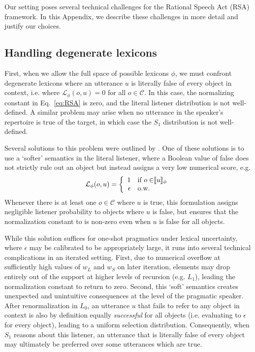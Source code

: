 \documentclass[11pt, floatsintext]{apa6}
\newcommand{\den}[1]{\ensuremath{\llbracket #1 \rrbracket}}
\begin{document}
Our setting poses several technical challenges for the Rational Speech Act (RSA) framework.
In this Appendix, we describe these challenges in more detail and justify our choices.

\subsection{Handling degenerate lexicons}

First, when we allow the full space of possible lexicons $\phi$, we must confront degenerate lexicons where an utterance $u$ is literally false of every object in context, i.e. where $\mathcal{L}_\phi(o, u) = 0$ for all $o\in \mathcal{C}$. 
In this case, the normalizing constant in Eq.~\ref{eq:RSA} is zero, and the literal listener distribution is not well-defined.
A similar problem may arise when no utterance in the speaker's repertoire is true of the target, in which case the $S_1$ distribution is not well-defined.

Several solutions to this problem were outlined by .
One of these solutions is to use a `softer' semantics in the literal listener, where a Boolean value of false does not strictly rule out an object but instead assigns a very low numerical score, e.g. 
$$\mathcal{L}_\phi(o,u) = \left\{ \begin{array} {rl} 1 & \textrm{if $o \in $\den{u}$_\phi$} \\ \epsilon & \textrm{o.w.} \end{array}\right.$$
Whenever there is at least one $o\in\mathcal{C}$ where $u$ is true, this formulation assigns negligible listener probability to objects where $u$ is false, but ensures that the normalization constant to is non-zero even when $u$ is false for all objects.

While this solution suffices for one-shot pragmatics under lexical uncertainty, where $\epsilon$ may be calibrated to be appropriately large, it runs into several technical complications in an iterated setting.
First, due to numerical overflow at sufficiently high values of $w_L$ and $w_S$ on later iteration, elements may drop entirely out of the support at higher levels of recursion (e.g. $L_1$), leading the normalization constant to return to zero. 
Second, this `soft' semantics creates unexpected and unintuitive consequences at the level of the pragmatic speaker. 
After renormalization in $L_0$, an utterance $u$ that fails to refer to any object in context is also by definition equally \emph{successful} for all objects (i.e. evaluating to $\epsilon$ for every object), leading to a uniform selection distribution.
Consequently, when $S_1$ reasons about this listener, an utterance that is literally false of every object may ultimately be preferred over some utterances which are true.
\end{document}
